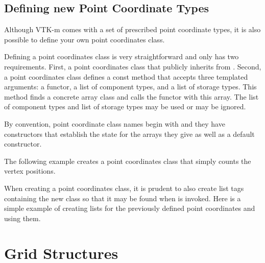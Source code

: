 


\subsection{Defining new Point Coordinate Types}

Although VTK-m comes with a set of prescribed point coordinate types, it is
also possible to define your own point coordinates class.

Defining a point coordinates class is very straightforward and only has two
requirements. First, a point coordinates class that publicly inherits from
. Second, a point coordinates class
defines a const  method that accepts three templated
arguments: a functor, a list of component types, and a list of storage
types. This method finds a concrete array class and calls the functor with
this array. The list of component types and list of storage types may be
used or may be ignored.

By convention, point coordinate class names begin with
 and they have constructors that establish the
state for the arrays they give as well as a default constructor.

The following example creates a point coordinates class that simply counts
the vertex positions. 


When creating a point coordinates class, it is prudent to also create list
tags containing the new class so that it may be found when
 is invoked. Here is a simple example of creating
lists for the previously defined point coordinates and using them.



\section{Grid Structures}
\label{sec:GridStructures}

